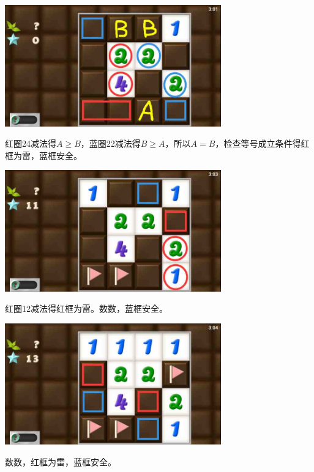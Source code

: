 \subsection{} %
\begin{center}
    \includegraphics[width=0.7\textwidth]{puzzlelow/153-1.jpg}
\end{center}
红圈24减法得$A\ge B$，蓝圈22减法得$B\ge A$，所以$A=B$，检查等号成立条件得红框为雷，蓝框安全。
\begin{center}
    \includegraphics[width=0.7\textwidth]{puzzlelow/153-2.jpg}
\end{center}
红圈12减法得红框为雷。数数，蓝框安全。
\begin{center}
    \includegraphics[width=0.7\textwidth]{puzzlelow/153-3.jpg}
\end{center}
数数，红框为雷，蓝框安全。

